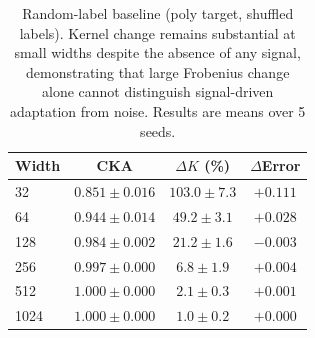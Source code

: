 \documentclass[10pt]{article}
\begin{document}
\begin{table}[h!]  %
    \centering\footnotesize
    \setlength{\tabcolsep}{4pt}
    \caption{Random-label baseline (poly target, shuffled labels).  Kernel change remains substantial at small widths despite the absence of any signal, demonstrating that large Frobenius change alone cannot distinguish signal-driven adaptation from noise.  Results are means over 5 seeds.}
    \label{tab:random_label}
    \begin{tabular}{lccc}
    \toprule
    Width & CKA & $\Delta K$ (\%) & $\Delta$Error \\
    \midrule
    32   & $0.851\pm0.016$ & $103.0\pm7.3$   & $+0.111$ \\
    64   & $0.944\pm0.014$ & $49.2\pm3.1$    & $+0.028$ \\
    128  & $0.984\pm0.002$ & $21.2\pm1.6$    & $-0.003$ \\
    256  & $0.997\pm0.000$ & $6.8\pm1.9$     & $+0.004$ \\
    512  & $1.000\pm0.000$ & $2.1\pm0.3$     & $+0.001$ \\
    1024 & $1.000\pm0.000$ & $1.0\pm0.2$     & $+0.000$ \\
    \bottomrule
    \end{tabular}
\end{table}
\end{document}
